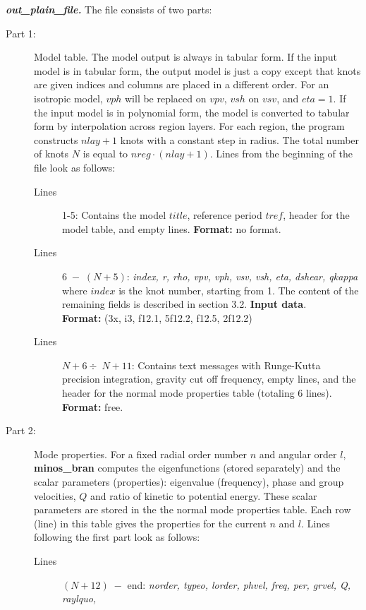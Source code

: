 \documentclass[11pt]{article}
\begin{document}
\noindent \textbf{\large \emph{out\_plain\_file.}}
The file consists of two parts:
\begin{description}
\item[Part 1:] Model table. The model output is always in tabular form.
If the input model is in tabular form, the output model is just a 
copy except that knots are given indices and
columns are placed in a different order. For an isotropic model, $vph$ 
will be replaced on $vpv$,  $vsh$ on $vsv$, and $eta=1$.
If the input model is in polynomial form,
the model is converted to tabular form by interpolation across
region layers. For each region, the program constructs $nlay+1$ knots with a
constant step in radius.
The total number of knots $N$ is equal to $nreg \cdot (nlay+1)$.
Lines from the beginning of the file look as follows:
\begin{description}
\item[Lines] 1-5: Contains the model $title$, reference period $tref$,
header for the model table, and empty lines. {\bf Format:} no format.
\item[Lines] $6\;-\; (N+5)$: {\it index, r, rho, vpv, vph, vsv, vsh, 
eta, dshear, qkappa}\\
where $index$ is the knot number, starting from 1. The content of the 
remaining fields is described in section 3.2. {\bf Input data}. \\
{\bf Format:} (3x, i3, f12.1, 5f12.2, f12.5, 2f12.2)
\item[Lines] $N+6 \div \; N+11$: Contains text messages with Runge-Kutta
precision integration, gravity cut off frequency, empty lines, and the header
for the normal mode properties table (totaling 6 lines).\\
{\bf Format:} free.
\end{description}
\item[Part 2:] Mode properties. For a fixed radial order number $n$ and 
angular order $l,$ {\bf minos\_bran} computes the eigenfunctions (stored
separately) and the scalar parameters (properties): eigenvalue (frequency),
phase and group velocities, $Q$ and ratio of kinetic to potential energy.
These scalar parameters are stored in the the normal mode properties table. Each row
(line) in this table gives the properties for the current $n$ and $l$.
Lines following the first part look as follows:
\begin{description}
\item[Lines] $(N+12)\;-$ end: {\it norder, typeo, lorder, phvel, freq, per, grvel, Q, raylquo,} \\

\end{description}
\end{description}
\end{document}
